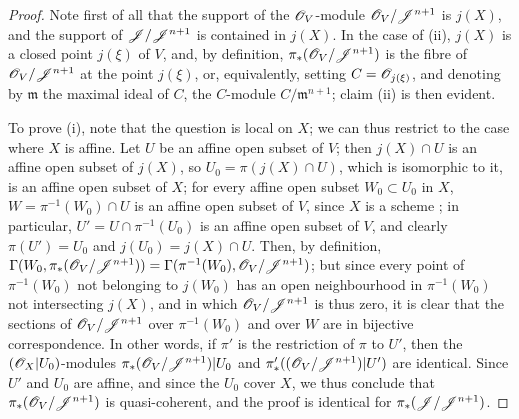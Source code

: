 \begin{proof}
\label{proof-II.8.10.1}
Note first of all that the support of the $\mathscr{O}_V$-module $\mathscr{O}_V/\mathscr{J}^{n+1}$ is $j(X)$, and the support of $\mathscr{J}/\mathscr{J}^{n+1}$ is contained in $j(X)$.
In the case of (ii), $j(X)$ is a closed point $j(\xi)$ of $V$,
and, by definition, $\pi_*(\mathscr{O}_V/\mathscr{J}^{n+1})$ is the fibre of $\mathscr{O}_V/\mathscr{J}^{n+1}$ at the point $j(\xi)$, or, equivalently, setting $C=\mathscr{O}_{j(\xi)}$, and denoting by $\mathfrak{m}$ the maximal ideal of $C$, the $C$-module $C/\mathfrak{m}^{n+1}$;
claim (ii) is then evident.

To prove (i), note that the question is local on $X$;
we can thus restrict to the case where $X$ is affine.
Let $U$ be an affine open subset of $V$;
then $j(X)\cap U$ is an affine open subset of $j(X)$, so $U_0=\pi(j(X)\cap U)$, which is isomorphic to it, is an affine open subset of $X$;
for every affine open subset $W_0\subset U_0$ in $X$, $W=\pi^{-1}(W_0)\cap U$ is an affine open subset of $V$, since $X$ is a scheme ;
in particular, $U'=U\cap\pi^{-1}(U_0)$ is an affine open subset of $V$, and clearly $\pi(U')=U_0$ and $j(U_0)=j(X)\cap U$.
Then, by definition, $\Gamma(W_0,\pi_*(\mathscr{O}_V/\mathscr{J}^{n+1})) = \Gamma(\pi^{-1}(W_0),\mathscr{O}_V/\mathscr{J}^{n+1})$;
but since every point of $\pi^{-1}(W_0)$ not belonging to $j(W_0)$ has an open neighbourhood in $\pi^{-1}(W_0)$ not intersecting $j(X)$, and in which $\mathscr{O}_V/\mathscr{J}^{n+1}$ is thus zero, it is clear that the sections of $\mathscr{O}_V/\mathscr{J}^{n+1}$ over $\pi^{-1}(W_0)$ and over $W$ are in bijective correspondence.
In other words, if $\pi'$ is the restriction of $\pi$ to $U'$, then the $(\mathscr{O}_X|U_0)$-modules $\pi_*(\mathscr{O}_V/\mathscr{J}^{n+1})|U_0$ and $\pi'_*((\mathscr{O}_V/\mathscr{J}^{n+1})|U')$ are identical.
Since $U'$ and $U_0$ are affine, and since the $U_0$ cover $X$, we thus conclude  that $\pi_*(\mathscr{O}_V/\mathscr{J}^{n+1})$ is quasi-coherent, and the proof is identical for $\pi_*(\mathscr{J}/\mathscr{J}^{n+1})$.


\end{proof}
